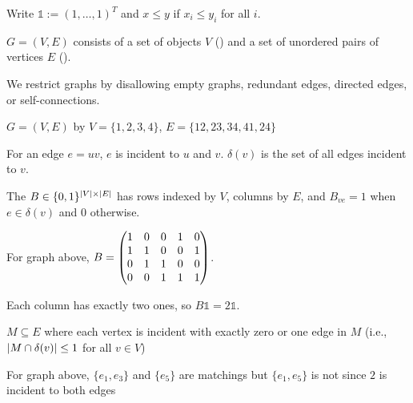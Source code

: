 \documentclass[class=co250,tikz,notes]{agony}
\begin{document}
\begin{notation}
  Write $\mathbb{1} := (1,\dotsc,1)^T$ and $x \leq y$ if $x_i \leq y_i$ for all $i$.
\end{notation}

\begin{defn}[graph]
  $G = (V, E)$ consists of a set of objects $V$ () and a set of unordered pairs of vertices $E$ ().

  We restrict graphs by disallowing empty graphs, redundant edges, directed edges, or self-connections.
\end{defn}
\begin{example}
  $G = (V, E)$ by $V = \{1,2,3,4\}$, $E=\{12,23,34,41,24\}$
\end{example}

\begin{defn}
  For an edge $e=uv$, $e$ is incident to $u$ and $v$.
  $\delta(v)$ is the set of all edges incident to $v$.

  The  $B \in \{0,1\}^{\abs{V}\times\abs{E}}$
  has rows indexed by $V$, columns by $E$, and $B_{ve} = 1$
  when $e \in \delta(v)$ and $0$ otherwise.
\end{defn}
\begin{example}
  For graph above, $B = \mqty(1&0&0&1&0 \\ 1&1&0&0&1 \\ 0&1&1&0&0 \\ 0&0&1&1&1)$.
\end{example}
\begin{remark}
  Each column has exactly two ones, so $B\mathbb{1} = 2\mathbb{1}$.
\end{remark}

\begin{defn}[matching]
  $M \subseteq E$ where each vertex is incident with exactly zero or one edge in $M$ (i.e., $\abs{M \cap \delta(v)} \leq 1$ for all $v \in V$)
\end{defn}
\begin{example}
  For graph above, $\{e_1, e_3\}$ and $\{e_5\}$ are matchings but $\{e_1, e_5\}$ is not since $2$ is incident to both edges
\end{example}
\end{document}
